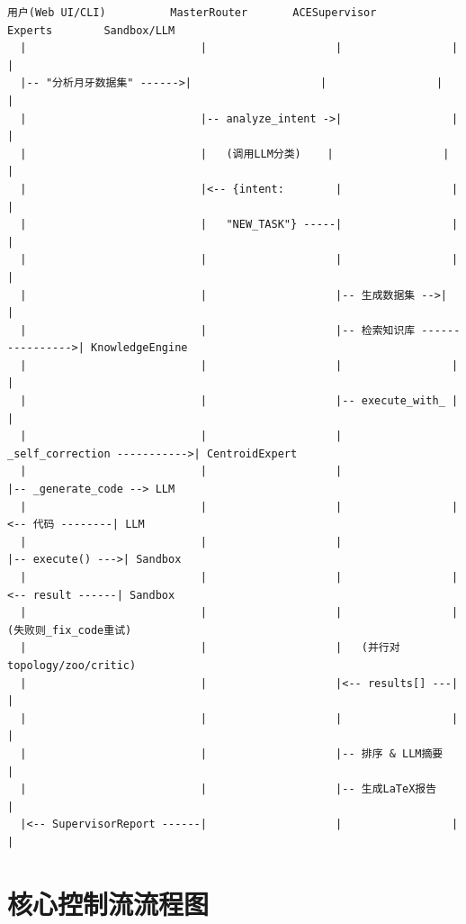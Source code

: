 \documentclass[11pt,a4paper]{ctexbook}
\begin{document}
\begin{tcolorbox}[title={\textbf{序列图：NEW\_TASK 路径}}, enhanced, breakable, colback=white]
{\small
\begin{verbatim}
用户(Web UI/CLI)          MasterRouter       ACESupervisor       Experts        Sandbox/LLM
  |                           |                    |                 |               |
  |-- "分析月牙数据集" ------>|                    |                 |               |
  |                           |-- analyze_intent ->|                 |               |
  |                           |   (调用LLM分类)    |                 |               |
  |                           |<-- {intent:        |                 |               |
  |                           |   "NEW_TASK"} -----|                 |               |
  |                           |                    |                 |               |
  |                           |                    |-- 生成数据集 -->|               |
  |                           |                    |-- 检索知识库 ---------------->| KnowledgeEngine
  |                           |                    |                 |               |
  |                           |                    |-- execute_with_ |               |
  |                           |                    |   _self_correction ----------->| CentroidExpert
  |                           |                    |                 |-- _generate_code --> LLM
  |                           |                    |                 |<-- 代码 --------| LLM
  |                           |                    |                 |-- execute() --->| Sandbox
  |                           |                    |                 |<-- result ------| Sandbox
  |                           |                    |                 |  (失败则_fix_code重试)
  |                           |                    |   (并行对topology/zoo/critic)
  |                           |                    |<-- results[] ---|               |
  |                           |                    |                 |               |
  |                           |                    |-- 排序 & LLM摘要              |
  |                           |                    |-- 生成LaTeX报告               |
  |<-- SupervisorReport ------|                    |                 |               |
\end{verbatim}
}
\end{tcolorbox}

\section{核心控制流流程图}
\end{document}
